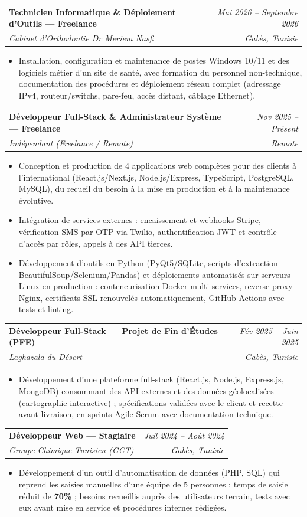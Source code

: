 \documentclass[letterpaper,9pt]{article}
\makeatletter
\newcommand{\resumeItem}[1]{\item\small{#1}}
\newcommand{\resumeSubheading}[4]{
  \vspace{-1pt}\item
  \begin{tabular*}{0.97\textwidth}[t]{l@{\extracolsep{\fill}}r}
    \textbf{#1} & \textit{\color{greytext}#2} \\
    \textit{\small\color{greytext} #3} & \textit{\small\color{greytext} #4}
  \end{tabular*}\vspace{-2pt}
}
\newcommand{\resumeItemListStart}{\begin{itemize}[leftmargin=0.24in, label={}, itemsep=0.9pt, topsep=1.2pt, parsep=0pt]}
\newcommand{\resumeItemListEnd}{\end{itemize}\vspace{-2pt}}
\makeatother
\begin{document}
  \resumeSubheading{Technicien Informatique \& Déploiement d'Outils --- Freelance}{Mai 2026 -- Septembre 2026}{Cabinet d'Orthodontie Dr Meriem Nasfi}{Gabès, Tunisie}
    \resumeItemListStart
      \resumeItem{Installation, configuration et maintenance de postes Windows 10/11 et des logiciels métier d'un site de santé, avec formation du personnel non-technique, documentation des procédures et déploiement réseau complet (adressage IPv4, routeur/switchs, pare-feu, accès distant, câblage Ethernet).}
    \resumeItemListEnd

  \resumeSubheading{Développeur Full-Stack \& Administrateur Système --- Freelance}{Nov 2025 -- Présent}{Indépendant (Freelance / Remote)}{Remote}
    \resumeItemListStart
      \resumeItem{Conception et production de 4 applications web complètes pour des clients à l'international (React.js/Next.js, Node.js/Express, TypeScript, PostgreSQL, MySQL), du recueil du besoin à la mise en production et à la maintenance évolutive.}
      \resumeItem{Intégration de services externes : encaissement et webhooks Stripe, vérification SMS par OTP via Twilio, authentification JWT et contrôle d'accès par rôles, appels à des API tierces.}
      \resumeItem{Développement d'outils en Python (PyQt5/SQLite, scripts d'extraction BeautifulSoup/Selenium/Pandas) et déploiements automatisés sur serveurs Linux en production : conteneurisation Docker multi-services, reverse-proxy Nginx, certificats SSL renouvelés automatiquement, GitHub Actions avec tests et linting.}
    \resumeItemListEnd

  \resumeSubheading{Développeur Full-Stack --- Projet de Fin d'Études (PFE)}{Fév 2025 -- Juin 2025}{Laghazala du Désert}{Gabès, Tunisie}
    \resumeItemListStart
      \resumeItem{Développement d'une plateforme full-stack (React.js, Node.js, Express.js, MongoDB) consommant des API externes et des données géolocalisées (cartographie interactive) ; spécifications validées avec le client et recette avant livraison, en sprints Agile Scrum avec documentation technique.}
    \resumeItemListEnd

  \resumeSubheading{Développeur Web --- Stagiaire}{Juil 2024 -- Août 2024}{Groupe Chimique Tunisien (GCT)}{Gabès, Tunisie}
    \resumeItemListStart
      \resumeItem{Développement d'un outil d'automatisation de données (PHP, SQL) qui reprend les saisies manuelles d'une équipe de 5 personnes : temps de saisie réduit de \textbf{70\%} ; besoins recueillis auprès des utilisateurs terrain, tests avec eux avant mise en service et procédures internes rédigées.}
    \resumeItemListEnd
\end{document}
